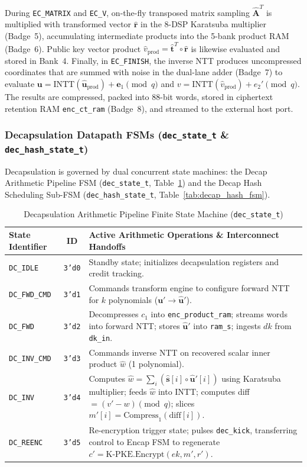 During \texttt{EC\_MATRIX} and \texttt{EC\_V}, on-the-fly transposed matrix sampling $\hat{\mathbf{A}}^T$ is multiplied with transformed vector $\hat{\mathbf{r}}$ in the 8-DSP Karatsuba multiplier (Badge~5), accumulating intermediate products into the 5-bank product RAM (Badge~6). Public key vector product $\hat{v}_{\text{prod}} = \hat{\mathbf{t}}^T \circ \hat{\mathbf{r}}$ is likewise evaluated and stored in Bank~4. Finally, in \texttt{EC\_FINISH}, the inverse NTT produces uncompressed coordinates that are summed with noise in the dual-lane adder (Badge~7) to evaluate $\mathbf{u} = \text{INTT}(\hat{\mathbf{u}}_{\text{prod}}) + \mathbf{e}_1 \pmod q$ and $v = \text{INTT}(\hat{v}_{\text{prod}}) + e_2' \pmod q$. The results are compressed, packed into 88-bit words, stored in ciphertext retention RAM \texttt{enc\_ct\_ram} (Badge~8), and streamed to the external host port.

\subsubsection{Decapsulation Datapath FSMs (\texttt{dec\_state\_t} \& \texttt{dec\_hash\_state\_t})}
Decapsulation is governed by dual concurrent state machines: the Decap Arithmetic Pipeline FSM (\texttt{dec\_state\_t}, Table~\ref{tab:decap_arith_fsm}) and the Decap Hash Scheduling Sub-FSM (\texttt{dec\_hash\_state\_t}, Table~\ref{tab:decap_hash_fsm}).

\begin{table}[!t]
\caption{Decapsulation Arithmetic Pipeline Finite State Machine (\texttt{dec\_state\_t})}
\label{tab:decap_arith_fsm}
\centering
\footnotesize
\begin{tabular}{@{} l c p{4.9cm} @{}}
\toprule
\textbf{State Identifier} & \textbf{ID} & \textbf{Active Arithmetic Operations \& Interconnect Handoffs} \\
\midrule
\texttt{DC\_IDLE} & \texttt{3'd0} & Standby state; initializes decapsulation registers and credit tracking. \\
\texttt{DC\_FWD\_CMD} & \texttt{3'd1} & Commands transform engine to configure forward NTT for $k$ polynomials ($\mathbf{u}' \to \hat{\mathbf{u}}'$). \\
\texttt{DC\_FWD} & \texttt{3'd2} & Decompresses $c_1$ into \texttt{enc\_product\_ram}; streams words into forward NTT; stores $\hat{\mathbf{u}}'$ into \texttt{ram\_s}; ingests $dk$ from \texttt{dk\_in}. \\
\texttt{DC\_INV\_CMD} & \texttt{3'd3} & Commands inverse NTT on recovered scalar inner product $\hat{w}$ (1 polynomial). \\
\texttt{DC\_INV} & \texttt{3'd4} & Computes $\hat{w} = \sum_i (\hat{\mathbf{s}}[i] \circ \hat{\mathbf{u}}'[i])$ using Karatsuba multiplier; feeds $\hat{w}$ into INTT; computes diff $= (v' - w) \pmod q$; slices $m'[i] = \text{Compress}_1(\text{diff}[i])$. \\
\texttt{DC\_REENC} & \texttt{3'd5} & Re-encryption trigger state; pulses \texttt{dec\_kick}, transferring control to Encap FSM to regenerate $c' = \text{K-PKE.Encrypt}(ek, m', r')$. \\
\bottomrule
\end{tabular}
\end{table}

